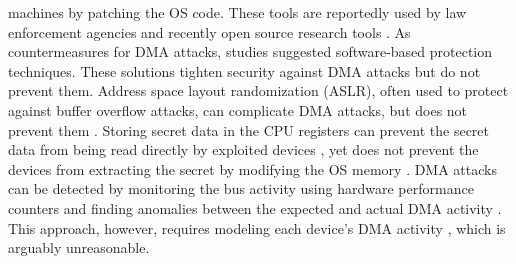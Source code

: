 machines by patching the OS code. These tools are reportedly used by law enforcement agencies and recently open source research tools \cite{thunder}. As countermeasures for DMA attacks, studies suggested software-based protection techniques. These solutions tighten security against DMA attacks but do not prevent them. Address space layout randomization (ASLR), often used to protect against buffer overflow attacks, can complicate DMA attacks, but does not prevent them \cite{SB12}. Storing secret data in the CPU registers can prevent the secret data from being read directly by exploited devices \cite{MFD11, CZG15, Sim11}, yet does not prevent the devices from extracting the secret by modifying the OS memory \cite{BR12}. DMA attacks can be detected by monitoring the bus activity using hardware performance counters and finding anomalies between the expected and actual DMA activity \cite{Ste13}. This approach, however, requires modeling each device’s DMA activity \cite{Ste14}, which is arguably unreasonable.
